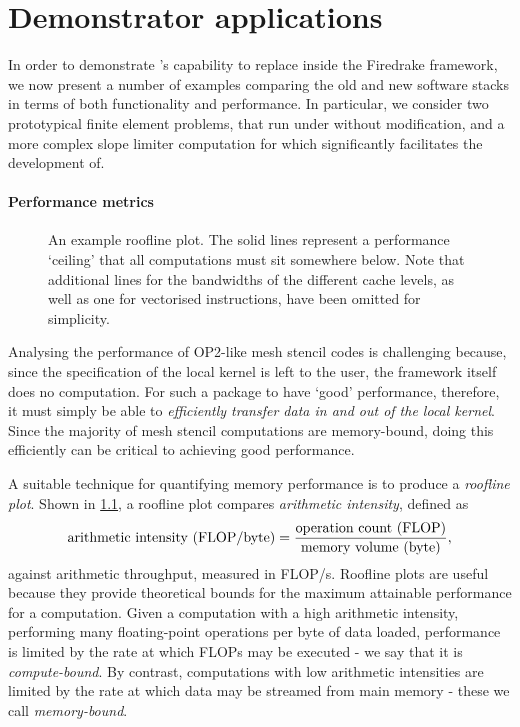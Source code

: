 \documentclass[thesis]{subfiles}
\begin{document}
\chapter{Demonstrator applications}
\label{chapter:demonstrator_applications}

In order to demonstrate 's capability to replace  inside the Firedrake framework, we now present a number of examples comparing the old and new software stacks in terms of both functionality and performance.
In particular, we consider two prototypical finite element problems, that run under  without modification, and a more complex slope limiter computation for which  significantly facilitates the development of.

\subsubsection{Performance metrics}

\begin{figure}
  \centering
  
  \caption{
    An example roofline plot.
    The solid lines represent a performance `ceiling' that all computations must sit somewhere below.
    Note that additional lines for the bandwidths of the different cache levels, as well as one for vectorised instructions, have been omitted for simplicity.
  }
  \label{fig:roofline}
\end{figure}

Analysing the performance of OP2-like mesh stencil codes is challenging because, since the specification of the local kernel is left to the user, the framework itself does no computation.
For such a package to have `good' performance, therefore, it must simply be able to \emph{efficiently transfer data in and out of the local kernel}.
Since the majority of mesh stencil computations are memory-bound, doing this efficiently can be critical to achieving good performance.

A suitable technique for quantifying memory performance is to produce a \emph{roofline plot}.
Shown in \cref{fig:roofline}, a roofline plot compares \emph{arithmetic intensity}, defined as
\begin{equation}
  \textnormal{arithmetic intensity (FLOP/byte)} = \frac{\textnormal{operation count (FLOP)}}{\textnormal{memory volume (byte)}},
\end{equation}
against arithmetic throughput, measured in FLOP/s.
Roofline plots are useful because they provide theoretical bounds for the maximum attainable performance for a computation.
Given a computation with a high arithmetic intensity, performing many floating-point operations per byte of data loaded, performance is limited by the rate at which FLOPs may be executed - we say that it is \emph{compute-bound}.
By contrast, computations with low arithmetic intensities are limited by the rate at which data may be streamed from main memory - these we call \emph{memory-bound}.
\end{document}
